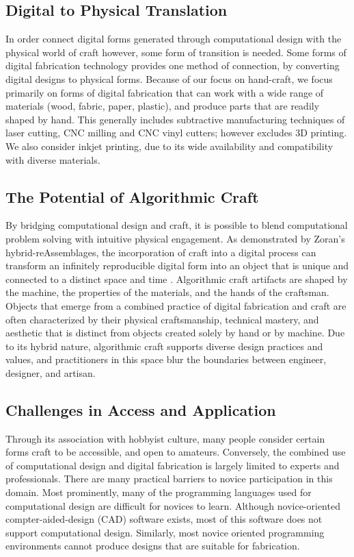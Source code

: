 \documentclass{sigchi}
\begin{document}
\subsection{Digital to Physical Translation}
In order connect digital forms generated through computational design with the physical world of craft however, some form of transition is needed. Some forms of digital fabrication technology provides one method of connection, by converting digital designs to physical forms. Because of our focus on hand-craft, we focus primarily on forms of digital fabrication that can work with a wide range of materials (wood, fabric, paper, plastic), and produce parts that are readily shaped by hand. This generally includes subtractive manufacturing techniques of laser cutting, CNC milling and CNC vinyl cutters\cite{dunn}; however excludes 3D printing. We also consider inkjet printing, due to its wide availability and compatibility with diverse materials.

\subsection{The Potential of Algorithmic Craft}
By bridging computational design and craft, it is possible to blend computational problem solving with intuitive physical engagement. As demonstrated by Zoran's hybrid-reAssemblages, the incorporation of craft into a digital process can transform an infinitely reproducible digital form into an object that is unique and connected to a distinct space and time \cite{zoran}. Algorithmic craft artifacts are shaped by the machine, the properties of the materials, and the hands of the craftsman. Objects that emerge from a combined practice of digital fabrication and craft are often characterized by their physical craftsmanship, technical mastery, and aesthetic that is distinct from objects created solely by hand or by machine. Due to its hybrid nature, algorithmic craft supports diverse design practices and values, and practitioners in this space blur the boundaries between engineer, designer, and artisan.

\subsection{Challenges in Access and Application}
Through its association with hobbyist culture, many people consider certain forms craft to be accessible, and open to amateurs. Conversely, the combined use of computational design and digital fabrication is largely limited to experts and professionals. There are many practical barriers to novice participation in this domain. Most prominently, many of the programming languages used for computational design are difficult for novices to learn. Although novice-oriented compter-aided-design (CAD) software exists, most of this software does not support computational design. Similarly, most novice oriented programming environments cannot produce designs that are suitable for fabrication. 
\end{document}

